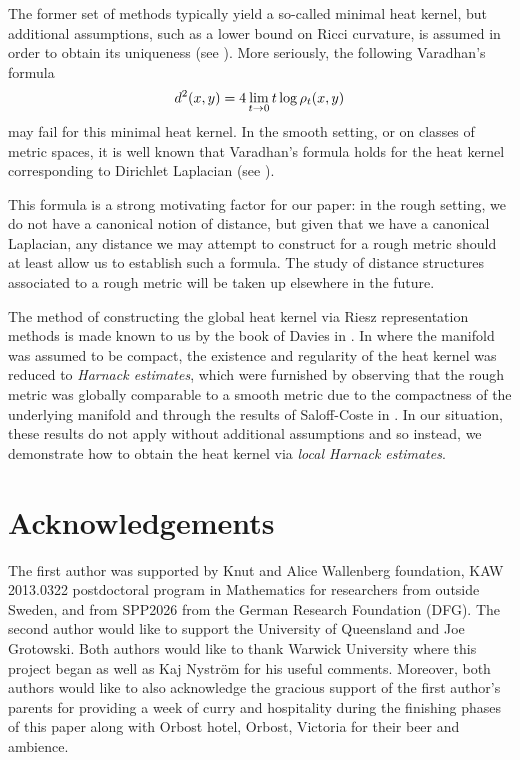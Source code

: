 \documentclass[a4paper, 12pt]{amsart}
\begin{document}
The former set of methods typically yield a so-called minimal heat kernel,
but additional assumptions, such as a lower bound on Ricci curvature,
is assumed in order to obtain its uniqueness (see \cite{Chavel}).
More seriously, the following Varadhan's formula
$$ d^2(x,y) = 4 \lim_{t \to 0} t \log \rho_t(x,y)$$
may fail for this minimal heat kernel. In the smooth setting, or on classes of
metric spaces, it is well known that Varadhan's formula holds for the heat 
kernel corresponding to Dirichlet Laplacian 
(see  \cite{Berger, ERS}).

This formula is a strong motivating factor for our paper: 
in the rough setting, we do not have a canonical notion of
distance, but given that we have a canonical Laplacian, 
any distance we may attempt to construct for a rough 
metric should at least allow us to establish such a formula.  
The study of distance structures associated to a rough metric 
will be taken up elsewhere in the future.

The method of constructing the global heat kernel
via Riesz representation methods is made known to us by
the book of Davies in \cite{Davies}.
In \cite{BCont} where the manifold was assumed to be compact, 
the existence and regularity of the heat kernel was
reduced to \emph{Harnack estimates}, which were
furnished by observing that  
the rough metric was globally comparable to a smooth metric
due to the compactness of the underlying manifold and
through the  results of Saloff-Coste in \cite{SC}.
In our situation, these results do not apply without additional assumptions
and so instead, we demonstrate
how to obtain the heat kernel via \emph{local Harnack estimates}. 

\section*{Acknowledgements}

The first author was supported by Knut and Alice Wallenberg foundation, KAW 2013.0322 
postdoctoral program in Mathematics for researchers from outside Sweden, and from SPP2026 
from the German Research Foundation (DFG).
The second author would like to support the University of Queensland and Joe Grotowski.
Both authors would like to thank Warwick University where this project began as
well as Kaj Nyström for his useful comments.
Moreover, both authors would like to also acknowledge the gracious support of the first author's 
parents for providing a week of curry and hospitality during the finishing phases
of this paper along with Orbost hotel, Orbost, Victoria for their beer and ambience. 
\end{document}
